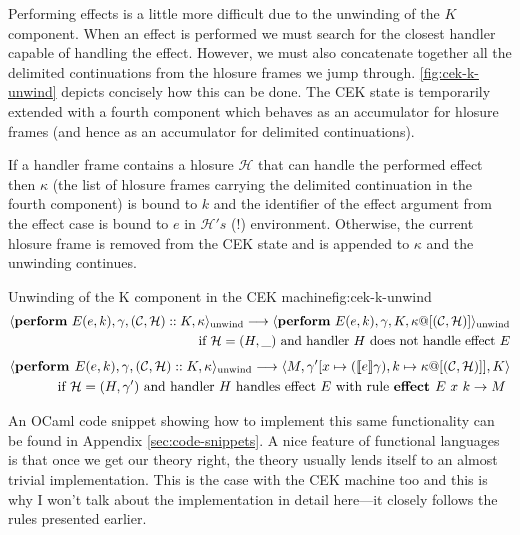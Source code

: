\documentclass[class=article, crop=false]{standalone}
\begin{document}
Performing effects is a little more difficult due to the unwinding of the $K$ component. When
an effect is performed we must search for the closest handler capable of handling the effect.
However, we must also concatenate together all the delimited continuations from the hlosure frames
we jump through. \autoref{fig:cek-k-unwind} depicts concisely how this can be done. The CEK state
is temporarily extended with a fourth component which behaves as an accumulator for hlosure
frames (and hence as an accumulator for delimited continuations).

If a handler frame contains a hlosure $\mathcal{H}$ that can handle the performed effect then $\kappa$ (the list of
hlosure frames carrying the delimited continuation in the fourth component) is bound to $k$ and the
identifier of the effect argument from the effect case is bound to $e$ in $\mathcal{H}'s$ (!) environment.
Otherwise, the current hlosure frame is removed from the CEK state and is appended to $\kappa$ and the unwinding
continues.

\begin{myfigure}[.95]{Unwinding of the K component in the CEK machine}{fig:cek-k-unwind}
    \begin{align*}
        \cek{ \effPerform E(e,k), \gamma, (\konts, \hlosure) :: K, \kappa}_\text{unwind} \longrightarrow
        \cek{ \effPerform E(e,k), \gamma, K, \kappa@[(\konts, \hlosure)] }_\text{unwind} \\
        \text{ if $\hlosure = (H, \_)$ and handler $H$ does not handle effect $E$}
        \end{align*}
        \begin{align*}
        \langle  \textbf{perform } E(e,k), \gamma, (\mathcal{C}, \mathcal{H}) :: K, \kappa \rangle_\text{unwind} \longrightarrow
        \langle  M, \gamma' [x \mapsto (\llbracket e \rrbracket\gamma), k \mapsto \kappa @ [(\mathcal{C}, \mathcal{H})]], K \rangle \\
        \text{ if $\mathcal{H} = (H, \gamma')$ and handler $H$ handles effect $E$ with rule $\textbf{effect } E\ x \ k \to M$ }
        \end{align*}
\end{myfigure}

An OCaml code snippet showing how to implement this same functionality can be found in Appendix \autoref{sec:code-snippets}.
A nice feature of functional languages is that once we get our theory right, the theory usually lends
itself to an almost trivial implementation. This is the case with the CEK machine too and this is why
I won't talk about the implementation in detail here---it closely follows the rules presented earlier.
\end{document}
